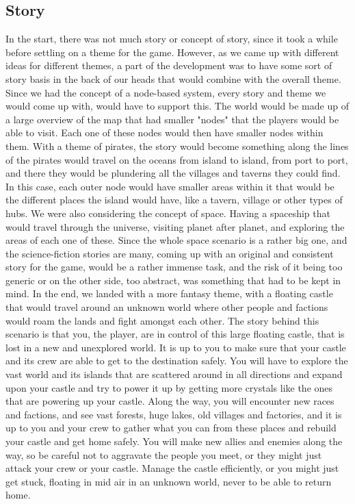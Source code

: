 \subsection{Story}
In the start, there was not much story or concept of story, since it took a while before settling on a theme for the game. However, as we came up with different ideas for different themes, a part of the development was to have some sort of story basis in the back of our heads that would combine with the overall theme. Since we had the concept of a node-based system, every story and theme we would come up with, would have to support this. The world would be made up of a large overview of the map that had smaller "nodes" that the players would be able to visit. Each one of these nodes would then have smaller nodes within them. 
With a theme of pirates, the story would become something along the lines of the pirates would travel on the oceans from island to island, from port to port, and there they would be plundering all the villages and taverns they could find. In this case, each outer node would have smaller areas within it that would be the different places the island would have, like a tavern, village or other types of hubs. We were also considering the concept of space. Having a spaceship that would travel through the universe, visiting planet after planet, and exploring the areas of each one of these. Since the whole space scenario is a rather big one, and the science-fiction stories are many, coming up with an original and consistent story for the game, would be a rather immense task, and the risk of it being too generic or on the other side, too abstract, was something that had to be kept in mind. 
In the end, we landed with a more fantasy theme, with a floating castle that would travel around an unknown world where other people and factions would roam the lands and fight amongst each other. The story behind this scenario is that you, the player, are in control of this large floating castle, that is lost in a new and unexplored world. It is up to you to make sure that your castle and its crew are able to get to the destination safely. You will have to explore the vast world and its islands that are scattered around in all directions and expand upon your castle and try to power it up by getting more crystals like the ones that are powering up your castle. Along the way, you will encounter new races and factions, and see vast forests, huge lakes, old villages and factories, and it is up to you and your crew to gather what you can from these places and rebuild your castle and get home safely. You will make new allies and enemies along the way, so be careful not to aggravate the people you meet, or they might just attack your crew or your castle. Manage the castle efficiently, or you might just get stuck, floating in mid air in an unknown world, never to be able to return home.

